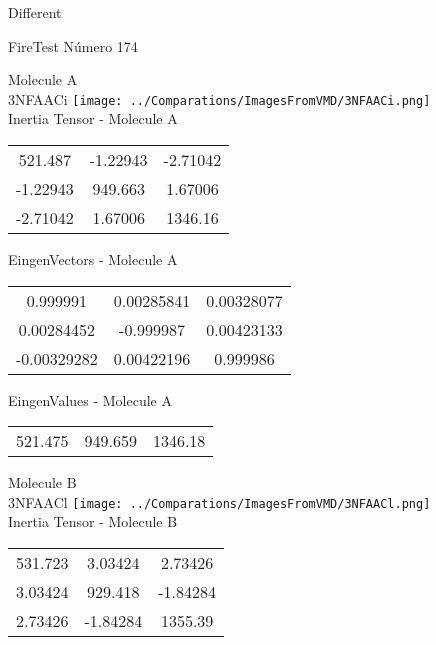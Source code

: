 \begin{center}
\vtab
\vtab
\textcolor{NavyBlue}{\Large Different}
\end{center}

 \newpage

\vtab[-2cm]
\begin{center}
{\large FireTest \tab Número 174}
\end{center}
\begin{multicols}{2}
\begin{center}

Molecule A \\ 
3NFAACi
\texttt{[image: ../Comparations/ImagesFromVMD/3NFAACi.png]}
\\
Inertia Tensor - Molecule A \\
\vtab

\begin{tabular}{|c c c|}
521.487	 & 	-1.22943	 & 	-2.71042	 \\
-1.22943	 & 	949.663	 & 	1.67006	 \\
-2.71042	 & 	1.67006	 & 	1346.16
\end{tabular}

\vtab
 EingenVectors - Molecule A     \\
\vtab
\begin{tabular}{|c c c|}
0.999991	 & 	0.00285841	 & 	0.00328077	 \\
0.00284452	 & 	-0.999987	 & 	0.00423133	 \\
-0.00329282	 & 	0.00422196	 & 	0.999986
\end{tabular}

\vtab
 EingenValues - Molecule A     \\
\vtab
\begin{tabular}{|c c c|}
521.475	 & 	949.659	 & 	1346.18	 \\
\end{tabular}
\columnbreak

Molecule B \\ 
3NFAACl
\texttt{[image: ../Comparations/ImagesFromVMD/3NFAACl.png]}
\\
Inertia Tensor - Molecule B \\
\vtab

\begin{tabular}{|c c c|}
531.723	 & 	3.03424	 & 	2.73426	 \\
3.03424	 & 	929.418	 & 	-1.84284	 \\
2.73426	 & 	-1.84284	 & 	1355.39
\end{tabular}


\end{center}
\end{multicols}
